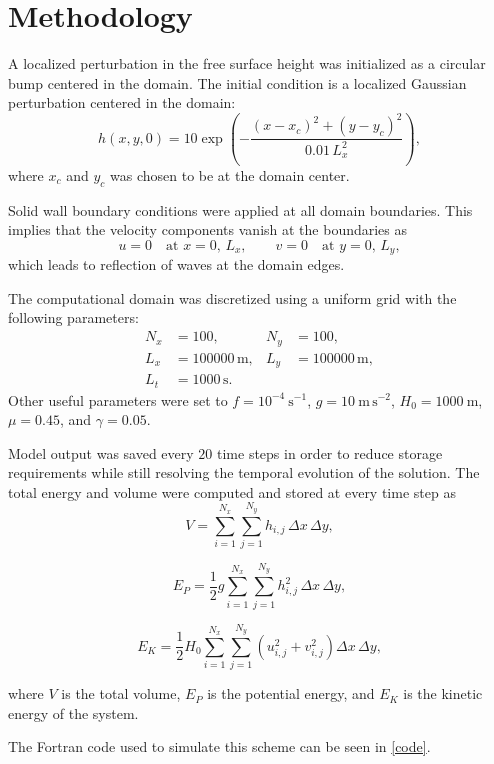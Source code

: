 \section{Methodology}

A localized perturbation in the free surface height was initialized as a circular bump centered in the domain. The initial condition is a localized Gaussian perturbation centered in the domain:
\begin{equation}
h(x,y,0) = 10 \exp\left(-\frac{(x-x_c)^2 + (y-y_c)^2}{0.01\,L_x^2}\right),
\end{equation}
where $x_c$ and $y_c$ was chosen to be at the domain center. 

Solid wall boundary conditions were applied at all domain boundaries. This implies that the velocity components vanish at the boundaries as 
\begin{equation}
u = 0 \quad \text{at } x=0,\,L_x, \qquad
v = 0 \quad \text{at } y=0,\,L_y,
\end{equation}
which leads to reflection of waves at the domain edges.

The computational domain was discretized using a uniform grid with the following parameters:
\begin{align}
N_x &= 100, & N_y &= 100, \\
L_x &= 100000\,\text{m}, & L_y &= 100000\,\text{m}, \\
L_t &= 1000\,\text{s}.
\end{align}
Other useful parameters were set to $f = 10^{-4}\ \mathrm{s^{-1}}$, $g = 10\ \mathrm{m\,s^{-2}}$, $H_0 = 1000\ \mathrm{m}$, $\mu = 0.45$, and $\gamma = 0.05$.

Model output was saved every $20$ time steps in order to reduce storage requirements while still resolving the temporal evolution of the solution.
The total energy and volume were computed and stored at every time step as
\begin{equation}
V = \sum_{i=1}^{N_x} \sum_{j=1}^{N_y} h_{i,j} \, \Delta x \, \Delta y,
\end{equation}

\begin{equation}
E_P = \frac{1}{2} g \sum_{i=1}^{N_x} \sum_{j=1}^{N_y} h_{i,j}^2 \, \Delta x \, \Delta y,
\end{equation}

\begin{equation}
E_K = \frac{1}{2} H_0 \sum_{i=1}^{N_x} \sum_{j=1}^{N_y} \left( u_{i,j}^2 + v_{i,j}^2 \right) \Delta x \, \Delta y,
\end{equation}

where $V$ is the total volume, $E_P$ is the potential energy, and $E_K$ is the kinetic energy of the system.

The Fortran code used to simulate this scheme can be seen in \autoref{code}. 